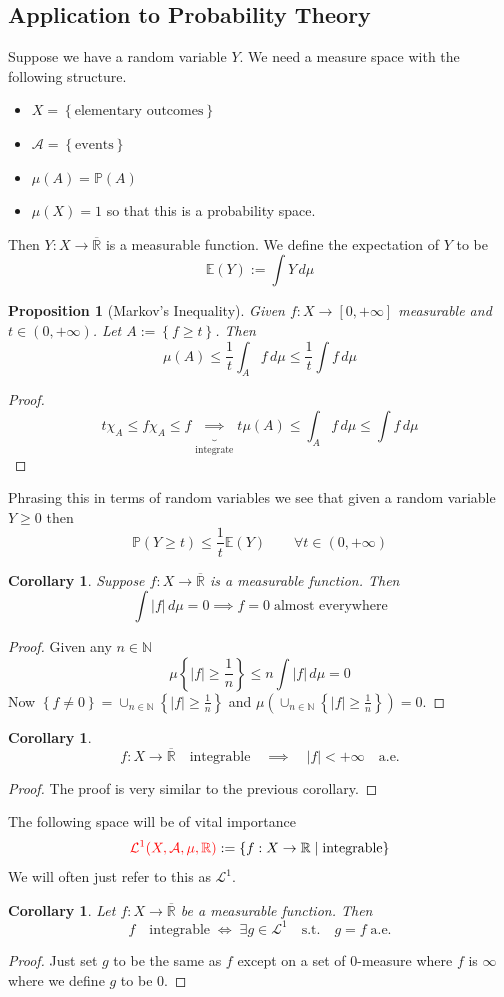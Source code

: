 \documentclass[11pt]{article}
\newcommand{\defeq}{:=}
\newcommand{\abs}[1]{|#1|}
\newcommand{\relmiddle}[1]{\mathrel{}\middle#1\mathrel{}}
\newcommand{\rmv}{\relmiddle|}
\newcommand{\dm}{\ensuremath{\,d\mu}}
\newcommand{\R}{\mathbb{R}}
\newcommand{\Rb}{\overline{\R}}
\newcommand{\N}{\mathbb{N}}
\newenvironment{defin}
	{\begin{mdframed}[backgroundcolor=white, roundcorner=5pt, linewidth=1pt]}
	{\end{mdframed}}
\newcommand{\mdf}[1]{{\color{red} #1}}
\newtheorem{prop}[theorem]{Proposition}
\newtheorem{cor}[theorem]{Corollary}
\begin{document}
\subsection{Application to Probability Theory}
Suppose we have a \mdf{random variable} $Y$.
We need a measure space with the following structure.
\begin{itemize}
	\item $X=\left\{\text{elementary outcomes}\right\}$
	\item $\mathcal{A}=\left\{\text{events}\right\}$
	\item $\mu(A)=\mathbb{P}(A)$
	\item $\mu(X)=1$ so that this is a probability space.
\end{itemize}
Then $Y:X\to\Rb$ is a measurable function.
We define the \mdf{expectation} of $Y$ to be
\[
	\mathbb{E}(Y)\defeq \int Y \dm
\]
\begin{prop}[Markov's Inequality]
	Given $f:X\to [0, +\infty]$ measurable and $t\in(0, +\infty)$.
	Let $A\defeq\left\{f \geq t \right\}$.
	Then
	\[
		\mu(A) \leq \frac{1}{t}\int_A f \dm \leq \frac{1}{t}\int f \dm
	\]
\end{prop}
\begin{proof}
\[
	t\chi_A \leq f\chi_A \leq f \underbrace{\implies}_{\text{integrate}} t\mu(A)\leq \int_A f\dm \leq \int f\dm
\]
\end{proof}
Phrasing this in terms of random variables we see that given a random variable $Y\geq 0$ then
\[
	\mathbb{P}(Y\geq t) \leq \frac{1}{t}\mathbb{E}(Y)\quad\quad\forall t\in (0, +\infty)
\]
\begin{cor}
Suppose $f:X\to\Rb$ is a measurable function.
Then 
\[
	\int \abs{f} \dm = 0 \implies f=0 \;\text{almost everywhere}
\]
\end{cor}
\begin{proof}
Given any $n\in\N$
\[
	\mu\left\{\abs{f}\geq\frac{1}{n}\right\}\leq n\int \abs{f} \dm = 0
\]
Now $\left\{f\neq 0\right\}=\cup_{n\in\N} \left\{\abs{f} \geq \frac{1}{n}\right\}$ and $\mu\left(\cup_{n\in\N}\left\{\abs{f}\geq \frac{1}{n}\right\}\right)=0$.
\end{proof}
\begin{cor}
	\[
		f:X\to\Rb\quad\text{integrable}\quad\implies\quad \abs{f}< + \infty \quad \text{a.e.}
	\]
\end{cor}
\begin{proof}
The proof is very similar to the previous corollary.
\end{proof}
\begin{defin}
The following space will be of vital importance
\[
	\mdf{\mathcal{L}^1(X, \mathcal{A},\mu,\R)}\defeq\left\{f:X\to\R \rmv \text{integrable} \right\}
\]
We will often just refer to this as $\mathcal{L}^1$.
\end{defin}
\begin{cor}
Let $f:X\to\Rb$ be a measurable function. Then
\[
	f\quad\text{integrable}\;\iff\;\exists g\in\mathcal{L}^1\quad\text{s.t.}\quad g=f\;\text{a.e.}
\]
\end{cor}
\begin{proof}
Just set $g$ to be the same as $f$ except on a set of $0$-measure where $f$ is $\infty$ where we define $g$ to be $0$.
\end{proof}
\end{document}
